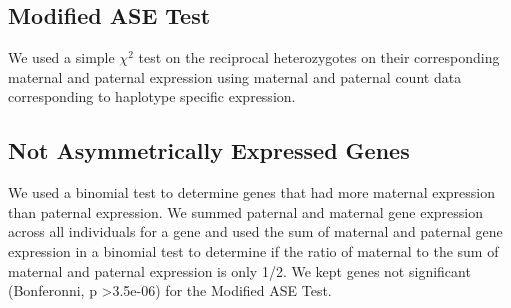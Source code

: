 \subsection{Modified ASE Test}\label{Modified ASE Test}
We used a simple $\chi^2$ test on the reciprocal heterozygotes on their corresponding maternal and paternal expression using maternal and paternal count data corresponding to haplotype specific expression. 


\subsection{Not Asymmetrically Expressed Genes}\label{Not Asymmetrically Expressed Genes}
We used a binomial test to determine genes that had more maternal expression than paternal expression. We summed paternal and maternal gene expression across all individuals for a gene and used the sum of maternal and paternal gene expression in a binomial test to determine if the ratio of maternal to the sum of maternal and paternal expression is only 1/2. We kept genes not significant (Bonferonni, p \textgreater 3.5e-06) for the Modified ASE Test. 




